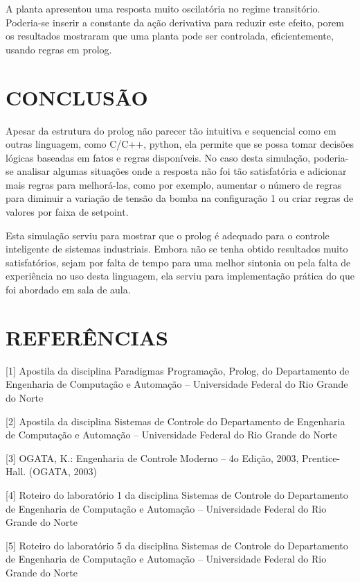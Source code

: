 \documentclass[a4paper,12pt]{article}
\begin{document}
A planta apresentou uma resposta muito oscilatória no regime transitório. Poderia-se inserir a constante da ação derivativa para reduzir este efeito, porem os resultados mostraram que uma planta pode ser controlada, eficientemente, usando regras em prolog.


\newpage

\thispagestyle{main}

\section{CONCLUSÃO}

Apesar da estrutura do prolog não parecer tão intuitiva e sequencial como em outras linguagem, como C/C++, python, ela permite que se possa tomar decisões lógicas baseadas em fatos e regras disponíveis. No caso desta simulação, poderia-se analisar algumas situações onde a resposta não foi tão satisfatória e adicionar mais regras para melhorá-las, como por exemplo, aumentar o número de regras para diminuir a variação de tensão da bomba na configuração 1 ou criar regras de valores por faixa de setpoint.  

Esta simulação serviu para mostrar que o prolog é adequado para o controle inteligente de sistemas industriais. Embora não se tenha obtido resultados muito satisfatórios, sejam por falta de tempo para uma melhor sintonia ou pela falta de experiência no uso desta linguagem, ela serviu para implementação prática do que foi abordado em sala de aula.



\newpage


\thispagestyle{main}

\section{REFERÊNCIAS}

[1] Apostila da disciplina Paradigmas Programação, Prolog, do Departamento de Engenharia de Computação e Automação – Universidade Federal do Rio Grande do Norte

[2] Apostila da disciplina Sistemas de Controle do Departamento de Engenharia de Computação e Automação – Universidade Federal do Rio Grande do Norte

[3] OGATA, K.: Engenharia de Controle Moderno – 4o Edição, 2003, Prentice-Hall. (OGATA, 2003)

[4] Roteiro do laboratório 1 da disciplina Sistemas de Controle do Departamento de Engenharia de Computação e Automação – Universidade Federal do Rio Grande do Norte

[5] Roteiro do laboratório 5 da disciplina Sistemas de Controle do Departamento de Engenharia de Computação e Automação – Universidade Federal do Rio Grande do Norte

  

% 

\appendix


\end{document}
